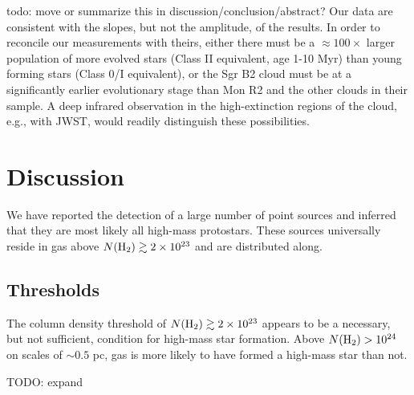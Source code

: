 \documentclass[twocolumn]{aastex61}
\begin{document}
{\color{red} todo: move or summarize this in discussion/conclusion/abstract?}
Our data are consistent with the slopes, but not the amplitude, of the
\citet{Gutermuth2011a} results.  In order to reconcile our measurements with
theirs, either there must be a $\approx100\times$ larger population of more
evolved stars (Class II equivalent, age 1-10 Myr) than young forming stars
(Class 0/I equivalent), or the Sgr B2 cloud must be at a significantly earlier
evolutionary stage than Mon R2 and the other clouds in their sample.
A deep infrared observation in the high-extinction regions of the cloud,
e.g., with JWST, would readily distinguish these possibilities.



\section{Discussion}
\label{sec:discussion}
We have reported the detection of a large number of point sources and inferred
that they are most likely all high-mass protostars.  These sources universally
reside in gas above $N(\textrm{H}_{2})\gtrsim2\times10^{23}$ \persc and are distributed along.

\subsection{Thresholds}
The column density threshold of $N(\textrm{H}_{2})\gtrsim2\times10^{23}$ \persc appears
to be a necessary, but not sufficient, condition for high-mass star formation.  
Above $N(\textrm{H}_{2})>10^{24}$ \persc on scales of $\sim0.5$ pc, gas is more likely to
have formed a high-mass star than not.

TODO: expand




\end{document}
